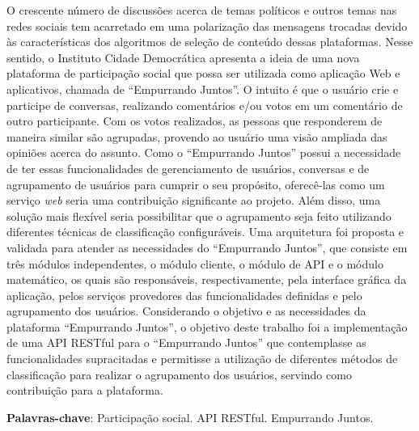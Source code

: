 \begin{resumo}
O crescente número de discussões acerca de temas políticos e outros temas nas redes sociais tem acarretado em uma polarização
das mensagens trocadas devido às características dos algoritmos de seleção de conteúdo dessas plataformas.
Nesse sentido, o Instituto Cidade Democrática apresenta a ideia de uma nova plataforma de participação social
que possa ser utilizada como aplicação Web e aplicativos, chamada de ``Empurrando Juntos''.
O intuito é que o usuário crie e participe de conversas, realizando comentários e/ou votos em um comentário de outro participante.
Com os votos realizados, as pessoas que responderem de maneira similar são agrupadas,
provendo ao usuário uma visão ampliada das opiniões acerca do assunto.
%
Como o ``Empurrando Juntos'' possui a necessidade de ter essas funcionalidades de
gerenciamento de usuários, conversas e de agrupamento de usuários para cumprir o seu propósito,
oferecê-las como um serviço \textit{web} seria uma contribuição significante ao projeto.
Além disso, uma solução mais flexível seria possibilitar que  o agrupamento seja feito
utilizando diferentes técnicas de classificação configuráveis.
%
Uma arquitetura foi proposta e validada para atender as necessidades do ``Empurrando Juntos'',
que consiste em três módulos independentes, o módulo cliente, o módulo de API e o módulo matemático,
os quais são responsáveis, respectivamente, pela interface gráfica da aplicação,
pelos serviços provedores das funcionalidades definidas e pelo agrupamento dos usuários.
%
Considerando o objetivo e as necessidades da plataforma ``Empurrando Juntos'',
o objetivo deste trabalho foi a implementação de uma API RESTful para o ``Empurrando Juntos''
que contemplasse as funcionalidades supracitadas e permitisse a utilização de diferentes
métodos de classificação para realizar o agrupamento dos usuários, servindo como contribuição para a plataforma.
\vspace{\onelineskip}


\noindent
\textbf{Palavras-chave}: Participação social. API RESTful. Empurrando Juntos.
\end{resumo}

